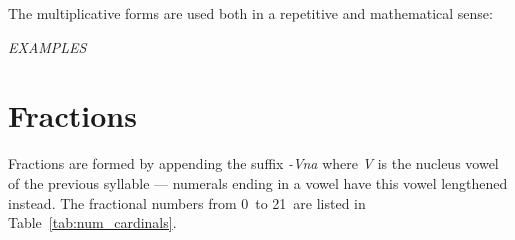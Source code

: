 \documentclass[grammar]{subfiles}
\begin{document}
	\begin{table}[htpb]\small\capstart
		\begin{center}
			\qquad
			\caption{Multiplicative numerals from 0\dec\ to 21\dec\label{tab:num_multiplicatives}}
		\end{center}
	\end{table}

	The multiplicative forms are used both in a repetitive and mathematical sense:

	\begin{exe}
		\ex \emph{EXAMPLES}
	\end{exe}

	\section{Fractions}
	\label{sec:num_fractions}

	Fractions are formed by appending the suffix \emph{-Vna} where \emph{V} is the nucleus vowel of the previous syllable — numerals ending in a vowel have this vowel lengthened instead. The fractional numbers from 0\dec\ to 21\dec\ are listed in Table~\ref{tab:num_cardinals}.
	
\end{document}
